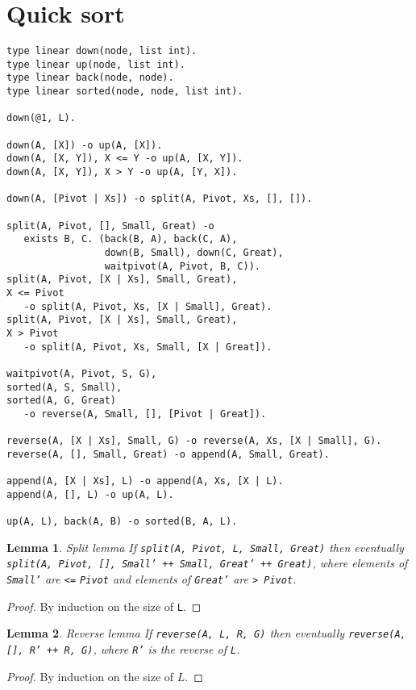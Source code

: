 \documentclass[9pt]{article}
\newtheorem{lemma}{Lemma}
\begin{document}
\section{Quick sort}

\begin{verbatim}
type linear down(node, list int).
type linear up(node, list int).
type linear back(node, node).
type linear sorted(node, node, list int).

down(@1, L).

down(A, [X]) -o up(A, [X]).
down(A, [X, Y]), X <= Y -o up(A, [X, Y]).
down(A, [X, Y]), X > Y -o up(A, [Y, X]).

down(A, [Pivot | Xs]) -o split(A, Pivot, Xs, [], []).

split(A, Pivot, [], Small, Great) -o
   exists B, C. (back(B, A), back(C, A),
                 down(B, Small), down(C, Great),
                 waitpivot(A, Pivot, B, C)).
split(A, Pivot, [X | Xs], Small, Great),
X <= Pivot
   -o split(A, Pivot, Xs, [X | Small], Great).
split(A, Pivot, [X | Xs], Small, Great),
X > Pivot
   -o split(A, Pivot, Xs, Small, [X | Great]).

waitpivot(A, Pivot, S, G),
sorted(A, S, Small),
sorted(A, G, Great)
   -o reverse(A, Small, [], [Pivot | Great]).

reverse(A, [X | Xs], Small, G) -o reverse(A, Xs, [X | Small], G).
reverse(A, [], Small, Great) -o append(A, Small, Great).

append(A, [X | Xs], L) -o append(A, Xs, [X | L).
append(A, [], L) -o up(A, L).

up(A, L), back(A, B) -o sorted(B, A, L).
\end{verbatim}

\begin{lemma}{Split lemma}
If \texttt{split(A, Pivot, L, Small, Great)} then eventually \texttt{split(A, Pivot, [], Small' ++ Small, Great' ++ Great)}, where elements of \texttt{Small'} are \texttt{<=} \texttt{Pivot} and elements of \texttt{Great'} are \texttt{> Pivot}.
\end{lemma}
\begin{proof}
By induction on the size of \texttt{L}.
\end{proof}

\begin{lemma}{Reverse lemma}
If \texttt{reverse(A, L, R, G)} then eventually \texttt{reverse(A, [], R' ++ R, G)}, where \texttt{R'} is the reverse of \texttt{L}.
\end{lemma}
\begin{proof}
By induction on the size of $L$.
\end{proof}
\end{document}

